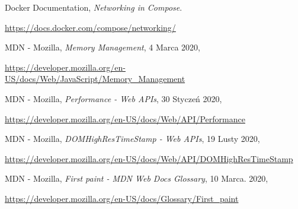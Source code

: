 \begin{thebibliography}{99}
Docker Documentation,
\emph{Networking in Compose}.

\url{https://docs.docker.com/compose/networking/}

MDN - Mozilla,
\emph{Memory Management},
4 Marca 2020,

\url{https://developer.mozilla.org/en-US/docs/Web/JavaScript/Memory_Management}

MDN - Mozilla,
\emph{Performance - Web APIs},
30 Styczeń 2020,

\url{https://developer.mozilla.org/en-US/docs/Web/API/Performance}

MDN - Mozilla,
\emph{DOMHighResTimeStamp - Web APIs},
19 Lusty 2020,

\url{https://developer.mozilla.org/en-US/docs/Web/API/DOMHighResTimeStamp}

MDN - Mozilla,
\emph{First paint - MDN Web Docs Glossary},
10 Marca. 2020,

\url{https://developer.mozilla.org/en-US/docs/Glossary/First_paint}


\end{thebibliography}


